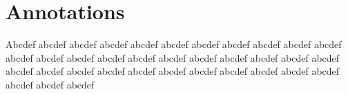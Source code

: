 \section{Annotations}

Abcdef abcdef abcdef abcdef abcdef abcdef abcdef abcdef abcdef
abcdef abcdef abcdef abcdef abcdef abcdef abcdef abcdef abcdef
abcdef abcdef abcdef abcdef abcdef abcdef abcdef abcdef abcdef
abcdef abcdef abcdef abcdef abcdef abcdef abcdef abcdef abcdef
